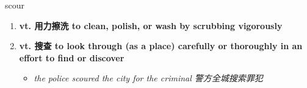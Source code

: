 
\begin{frame}
{\huge scour}
\begin{center}
\begin{enumerate}\Large
  \item \textbf{vt. 用力擦洗 to clean, polish, or wash by scrubbing vigorously}
  \item \textbf{vt. 搜查 to look through (as a place) carefully or thoroughly in an effort to find or discover}
  \begin{itemize}
    \item \em{\Large{the police scoured the city for the criminal 警方全城搜索罪犯}}
  \end{itemize}
\end{enumerate}
\end{center}
\end{frame}
